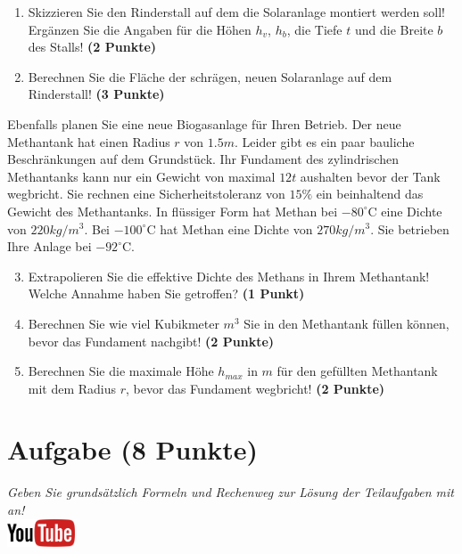 \documentclass[a4paper, 9pt]{scrartcl}\usepackage[]{graphicx}\usepackage[]{xcolor}
\begin{document}
\begin{enumerate}
\item Skizzieren Sie den Rinderstall auf dem die Solaranlage montiert
  werden soll! Erg{\"a}nzen Sie die Angaben f{\"u}r die H{\"o}hen $h_v$, $h_b$, die
  Tiefe $t$ und die Breite $b$ des Stalls!  \textbf{(2 Punkte)}
\item Berechnen Sie die Fl{\"a}che der schr{\"a}gen, neuen Solaranlage auf dem
  Rinderstall! \textbf{(3 Punkte)}
\end{enumerate}

Ebenfalls planen Sie eine neue Biogasanlage f{\"u}r Ihren Betrieb. Der neue
Methantank hat einen Radius $r$ von $1.5m$. Leider gibt es ein
paar bauliche Beschr{\"a}nkungen auf dem Grundst{\"u}ck. Ihr Fundament des
zylindrischen Methantanks kann nur ein Gewicht von maximal
$12t$ aushalten bevor der Tank wegbricht. Sie rechnen eine
Sicherheitstoleranz von $15\%$ ein beinhaltend das Gewicht des
Methantanks. In fl{\"u}ssiger Form hat
Methan bei $-80^\circ\text{C}$ eine Dichte von
$220kg/m^3$. Bei $-100^\circ\text{C}$ hat Methan eine Dichte
von $270kg/m^3$. Sie betrieben Ihre Anlage bei
$-92^\circ\text{C}$.

\begin{enumerate}
  \setcounter{enumi}{2}
\item Extrapolieren Sie die effektive Dichte des Methans in Ihrem
  Methantank! Welche Annahme haben Sie getroffen? \textbf{(1 Punkt)}
\item Berechnen Sie wie viel Kubikmeter $m^3$ Sie in den Methantank f{\"u}llen
  k{\"o}nnen, bevor das Fundament nachgibt! \textbf{(2 Punkte)}
\item Berechnen Sie die maximale H{\"o}he $h_{max}$ in $m$ f{\"u}r den gef{\"u}llten
  Methantank mit dem Radius $r$, bevor das Fundament wegbricht! \textbf{(2
    Punkte)}
\end{enumerate}

 
\clearpage

\section{Aufgabe \hfill (8 Punkte)}

\textit{Geben Sie grunds{\"a}tzlich Formeln und Rechenweg zur L{\"o}sung der
  Teilaufgaben mit an!} \\[1Ex]

\hfill\href{https://youtu.be/https://youtu.be/k2G52hMIfqk}{\includegraphics[width = 2cm]{img/youtube}} %
\hspace{2Ex}
\end{document}
